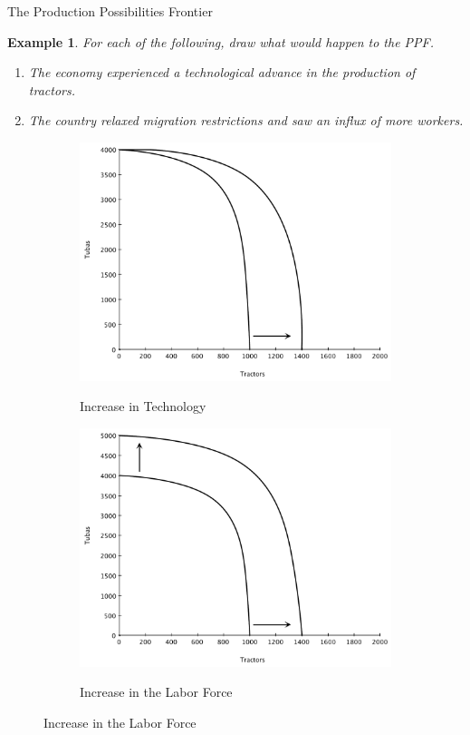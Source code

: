 \documentclass[xcolor={dvipsnames},pdf, hyperref={colorlinks=true, citecolor=ForestGreen, linkcolor=BlueViolet, urlcolor=Magenta}]{beamer}
\newtheorem{exmp}{Example}[section]
\newcommand{\blank}[0]{}
\newcommand{\ddp}[1]{{\textcolor{ForestGreen}{#1}}}
\begin{document}
\begin{frame}{The Production Possibilities Frontier}
		\begin{exmp} For each of the following, draw what would happen to the PPF.
			\begin{enumerate}
				\item The economy experienced a technological advance in the production of tractors.
				\item The country relaxed migration restrictions and saw an influx of more workers.
			\end{enumerate}
		\end{exmp} 
	\blank
	\blank
	\blank
	\blank
	
	
	\pause 
		
\begin{figure}[H]
	\centering
	\begin{subfigure}[t]{0.5\textwidth}
		\centering
		\ddp{\includegraphics[scale=.2]{plot2.pdf}}
		\caption{Increase in Technology}
		\label{ppf2}
	\end{subfigure}%
	\begin{subfigure}[t]{0.5\textwidth}
		\ddp{\includegraphics[scale=.2]{plot3.pdf}}
		\caption{Increase in the Labor Force}
		\label{ppf3}
	\end{subfigure}
\end{figure}

\end{frame}
\end{document}

